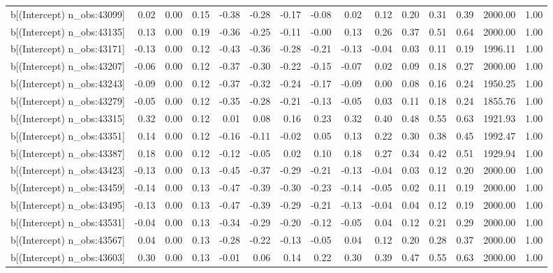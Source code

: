 \begin{table}[ht]
\begin{tabular}{rrrrrrrrrrrrrrr}
  b[(Intercept) n\_obs:43099] & 0.02 & 0.00 & 0.15 & -0.38 & -0.28 & -0.17 & -0.08 & 0.02 & 0.12 & 0.20 & 0.31 & 0.39 & 2000.00 & 1.00 \\ 
  b[(Intercept) n\_obs:43135] & 0.13 & 0.00 & 0.19 & -0.36 & -0.25 & -0.11 & -0.00 & 0.13 & 0.26 & 0.37 & 0.51 & 0.64 & 2000.00 & 1.00 \\ 
  b[(Intercept) n\_obs:43171] & -0.13 & 0.00 & 0.12 & -0.43 & -0.36 & -0.28 & -0.21 & -0.13 & -0.04 & 0.03 & 0.11 & 0.19 & 1996.11 & 1.00 \\ 
  b[(Intercept) n\_obs:43207] & -0.06 & 0.00 & 0.12 & -0.37 & -0.30 & -0.22 & -0.15 & -0.07 & 0.02 & 0.09 & 0.18 & 0.27 & 2000.00 & 1.00 \\ 
  b[(Intercept) n\_obs:43243] & -0.09 & 0.00 & 0.12 & -0.37 & -0.32 & -0.24 & -0.17 & -0.09 & 0.00 & 0.08 & 0.16 & 0.24 & 1950.25 & 1.00 \\ 
  b[(Intercept) n\_obs:43279] & -0.05 & 0.00 & 0.12 & -0.35 & -0.28 & -0.21 & -0.13 & -0.05 & 0.03 & 0.11 & 0.18 & 0.24 & 1855.76 & 1.00 \\ 
  b[(Intercept) n\_obs:43315] & 0.32 & 0.00 & 0.12 & 0.01 & 0.08 & 0.16 & 0.23 & 0.32 & 0.40 & 0.48 & 0.55 & 0.63 & 1921.93 & 1.00 \\ 
  b[(Intercept) n\_obs:43351] & 0.14 & 0.00 & 0.12 & -0.16 & -0.11 & -0.02 & 0.05 & 0.13 & 0.22 & 0.30 & 0.38 & 0.45 & 1992.47 & 1.00 \\ 
  b[(Intercept) n\_obs:43387] & 0.18 & 0.00 & 0.12 & -0.12 & -0.05 & 0.02 & 0.10 & 0.18 & 0.27 & 0.34 & 0.42 & 0.51 & 1929.94 & 1.00 \\ 
  b[(Intercept) n\_obs:43423] & -0.13 & 0.00 & 0.13 & -0.45 & -0.37 & -0.29 & -0.21 & -0.13 & -0.04 & 0.03 & 0.12 & 0.20 & 2000.00 & 1.00 \\ 
  b[(Intercept) n\_obs:43459] & -0.14 & 0.00 & 0.13 & -0.47 & -0.39 & -0.30 & -0.23 & -0.14 & -0.05 & 0.02 & 0.11 & 0.19 & 2000.00 & 1.00 \\ 
  b[(Intercept) n\_obs:43495] & -0.13 & 0.00 & 0.13 & -0.47 & -0.39 & -0.29 & -0.21 & -0.13 & -0.04 & 0.04 & 0.12 & 0.19 & 2000.00 & 1.00 \\ 
  b[(Intercept) n\_obs:43531] & -0.04 & 0.00 & 0.13 & -0.34 & -0.29 & -0.20 & -0.12 & -0.05 & 0.04 & 0.12 & 0.21 & 0.29 & 2000.00 & 1.00 \\ 
  b[(Intercept) n\_obs:43567] & 0.04 & 0.00 & 0.13 & -0.28 & -0.22 & -0.13 & -0.05 & 0.04 & 0.12 & 0.20 & 0.28 & 0.37 & 2000.00 & 1.00 \\ 
  b[(Intercept) n\_obs:43603] & 0.30 & 0.00 & 0.13 & -0.01 & 0.06 & 0.14 & 0.22 & 0.30 & 0.39 & 0.47 & 0.55 & 0.63 & 2000.00 & 1.00 \\ 

\end{tabular}
\end{table}
